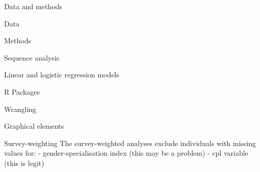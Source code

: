 \documentclass[
  ignorenonframetext,
]{beamer}
\begin{document}
\begin{frame}[fragile]{Data and methods}
\begin{block}{Data}
\end{block}

\begin{block}{Methods}
\protect\hypertarget{methods}{}
\begin{block}{Sequence analysis}
\protect\hypertarget{sequence-analysis}{}
\end{block}

\begin{block}{Linear and logistic regression models}
\protect\hypertarget{linear-and-logistic-regression-models}{}
\end{block}

\begin{block}{R Packages}
\protect\hypertarget{r-packages}{}
\end{block}

\begin{block}{Wrangling}
\protect\hypertarget{wrangling}{}
\end{block}

\begin{block}{Graphical elements}
\protect\hypertarget{graphical-elements}{}
\end{block}

\begin{block}{Survey-weighting}
\protect\hypertarget{survey-weighting}{}
The survey-weighted analyses exclude individuals with missing values
for: - gender-specialisation index (this may be a problem) - cpl
variable (this is legit)
\end{block}
\end{block}
\end{frame}
\end{document}
